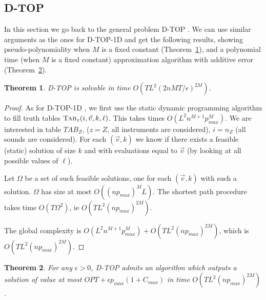 \documentclass[a4paper]{book}
\newtheorem{theorem}{Theorem}[chapter]
\newtheorem{proof}{\noindent{\bf Proof.} }
\newcommand{\dyn}{{\sc D-TOP }}
\newcommand{\dynoned}{{\sc D-TOP-1D }}
\begin{document}





\subsection{\dyn}

In this section we go back to the general problem \dyn. We can use similar arguments as the ones for \dynoned and get the following results, showing pseudo-polynomiality when $M$ is a fixed constant (Theorem~\ref{th:generaldynamic}), and a polynomial time (when $M$ is a fixed constant) approximation algorithm with additive error (Theorem~\ref{th:generaldynamicapprox}).

\begin{theorem}\label{th:generaldynamic}
\dyn is solvable in time $O(TL^2(2nMT/\epsilon)^{2M})$.
\end{theorem}

\begin{proof}
As for \dynoned, we first use the static dynamic programming algorithm to fill truth tables $\text{\sc{Tab}}_z(i,\vec{v},k,\ell)$. This takes times  $O(L^2n^{M+1}p_{max}^M)$. We are interested in table $TAB_Z$, ($z=Z$, all instruments are considered), $i=n_Z$ (all sounds are considered). For each $(\vec{v},k)$ we know if there exists a feasible (static) solution of size $k$ and with evaluations equal to $\vec{v}$ (by looking at all possible values of $\ell$). 

Let $\Omega$ be a set of such feasible solutions, one for each $(\vec{v},k)$ with such a solution. $\Omega$ has size at most $O((np_{max})^ML)$. The shortest path procedure takes time $O(T\Omega^2)$, ie $O(TL^2(np_{max})^{2M})$. 

The global complexity is $O(L^2n^{M+1}p_{max}^M)+O(TL^2(np_{max})^{2M})$, which is $O(TL^2(np_{max})^{2M})$.
\end{proof}


\begin{theorem}\label{th:generaldynamicapprox}
For any $\epsilon>0$, \dyn admits an algorithm which outputs a solution of value at most $OPT+\epsilon p_{max}(1+C_{max})$  in time $O(TL^2(np_{max})^{2M})$.

\end{theorem}
\end{document}
